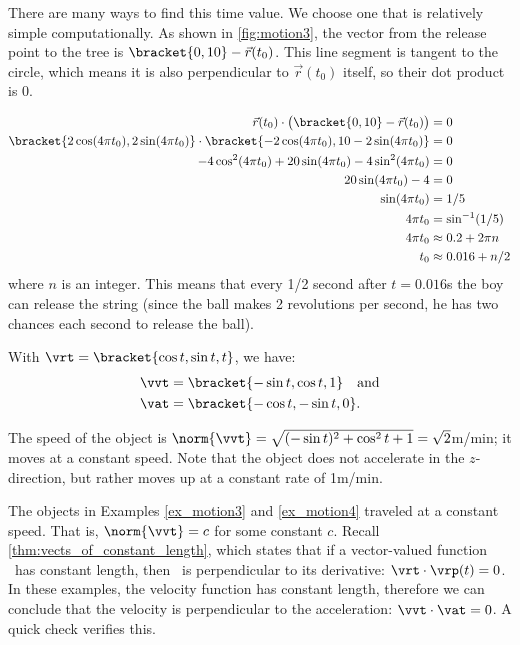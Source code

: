 {\begin{enumerate}
	There are many ways to find this time value. We choose one that is relatively simple computationally. As shown in \autoref{fig:motion3}, the vector from the release point to the tree is $\bracket{0,10}- \vec r(t_0)$. This line segment is tangent to the circle, which means it is also perpendicular to $\vec r(t_0)$ itself, so their dot product is 0.
	
	\begin{align*}
	\vec r(t_0) \cdot \big(\bracket{0,10}- \vec r(t_0)\big) &=0\\
	\bracket{2\cos (4\pi t_0), 2\sin (4\pi t_0)}\cdot\bracket{-2\cos(4\pi t_0),10-2\sin (4\pi t_0)}&=0\\
	-4\cos^2(4\pi t_0) + 20\sin (4\pi t_0)-4\sin^2(4\pi t_0) &= 0\\
	20\sin (4\pi t_0) - 4 &=0\\
	\sin (4\pi t_0) &=1/5\\
	4\pi t_0 &= \sin^{-1}(1/5)\\
	4\pi t_0 &\approx 0.2 + 2\pi n\\%
	t_0 &\approx 0.016 + n/2
	\end{align*}
	where $n$ is an integer.
	This means that every 1/2 second after $t=0.016$s the boy can release the string (since the ball makes 2 revolutions per second, he has two chances each second to release the ball).\eoehere
\end{enumerate}}

{With $\vrt =\bracket{\cos t,\sin t, t}$, we have:
\begin{align*}
\vvt &=\bracket{-\sin t, \cos t, 1}\quad \text{and} \\
\vat &=\bracket{-\cos t, -\sin t, 0}.
\end{align*}

The speed of the object is $\norm{\vvt} = \sqrt{(-\sin t)^2+\cos^2t+1} = \sqrt{2}$m/min; it moves at a constant speed. Note that the object does not accelerate in the $z$-direction, but rather moves up at a constant rate of 1m/min.}

The objects in Examples \ref{ex_motion3} and \ref{ex_motion4} traveled at a constant speed. That is, $\norm{\vvt} = c$ for some constant $c$. Recall \autoref{thm:vects_of_constant_length}, which states that if a vector-valued function \vrt\ has constant length, then \vrt\ is perpendicular to its derivative: $\vrt\cdot\vrp(t) = 0$. In these examples, the velocity function has constant length, therefore we can conclude that the velocity is perpendicular to the acceleration: $\vvt\cdot\vat = 0$. A quick check verifies this.

